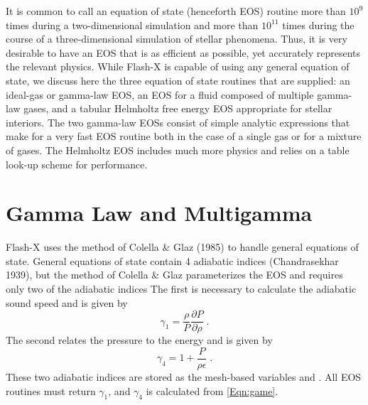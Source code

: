 It is common to call an equation of state (henceforth EOS) routine more
than $10^9$ times during a two-dimensional simulation and more than
$10^{11}$ times during the course of a three-dimensional simulation of
stellar phenomena.  Thus, it is very desirable to have an EOS
that is as efficient as possible, yet accurately represents the
relevant physics. While Flash-X is capable of using any
general equation of state, we discuss here the
three equation of state routines that are supplied: an ideal-gas or gamma-law
EOS, an EOS for a fluid composed of multiple gamma-law gases, and a
tabular Helmholtz free energy EOS appropriate for stellar
interiors. The two gamma-law EOSs consist of simple analytic expressions
that make for a very fast EOS routine both in the case of a single gas
or for a mixture of gases. The Helmholtz EOS includes much more
physics and relies on a table look-up scheme for performance.

\section{Gamma Law and Multigamma}
\label{Sec:Eos Gammas}
Flash-X uses the method of Colella \& Glaz (1985) to handle general
equations of state.  General equations of state contain 4 adiabatic
indices (Chandrasekhar 1939), but the method of Colella \& Glaz
parameterizes the EOS and requires only two of the adiabatic
indices%
The first is necessary to calculate
the adiabatic sound speed and is given by
\begin{equation}
\gamma_1 = \frac{\rho}{P}\frac{\partial P}{\partial \rho} \; .
\end{equation}
The second relates the pressure to the energy and is given by
\begin{equation}
\label{Eqn:game}\gamma_4 = 1 + \frac{P}{\rho\epsilon} \; .
\end{equation}
These two adiabatic indices are stored as the mesh-based variables  and
.
All EOS routines must return $\gamma_1$, and $\gamma_4$ is calculated from
\eqref{Eqn:game}.

